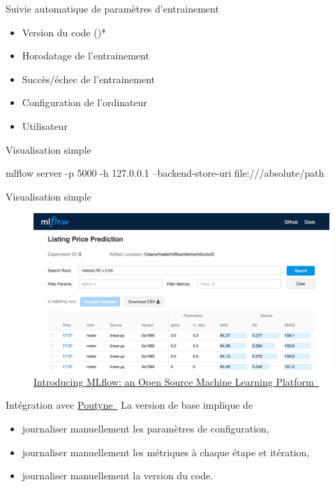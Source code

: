 \documentclass[aspectratio=169,10pt,xcolor=x11names,english,french]{beamer}
\makeatletter
\newenvironment{Scode}{%
	\def\FrameCommand##1{\hskip\@totalleftmargin
		\vrule width 3pt\colorbox{codebg}{\hspace{5pt}##1}%
		\hskip-\linewidth \hskip-\@totalleftmargin \hskip\columnwidth}%
	\MakeFramed {\advance\hsize-\width
		\@totalleftmargin\z@ \linewidth\hsize
		\advance\labelsep\fboxsep
		\@setminipage}%
}{\par\unskip\@minipagefalse\endMakeFramed}
\newcommand{\link}[2]{\href{#1}{#2~{\smaller\faExternalLink*}}}
\newcommand{\guillemet}[1]{\guillemotleft #1 \guillemotright}
\makeatother
\begin{document}
	\begin{frame}{Suivie automatique de paramètres d'entrainement}
		\begin{itemize}
			\item Version du code (\faGit)*
			\item Horodatage de l'entrainement
			\item Succès/échec de l'entrainement
			\item Configuration de l'ordinateur
			\item Utilisateur
		\end{itemize}
	\end{frame}

	\begin{frame}{Visualisation simple}
		\begin{Scode}
			mlflow server -p 5000 -h 127.0.0.1 --backend-store-uri file:///absolute/path
		\end{Scode}
	\end{frame}

	\begin{frame}{Visualisation simple}
		\centering
		\begin{figure}
			\includegraphics[width=\linewidth,keepaspectratio, height=0.7\textheight]{img/mlflow-ui.png}
			\caption{\link{https://databricks.com/blog/2018/06/05/introducing-mlflow-an-open-source-machine-learning-platform.html}{Introducing MLflow: an Open Source Machine Learning Platform}}
		\end{figure}
	\end{frame}


	\begin{frame}{Intégration avec \link{https://poutyne.org/}{Poutyne}}
		La version de \guillemet{base} implique de
		\begin{itemize}
			\item journaliser manuellement les paramètres de configuration,
			\item journaliser manuellement les métriques à chaque étape et itération,
			\item journaliser manuellement la version du code.
		\end{itemize}
	\end{frame}
\end{document}
